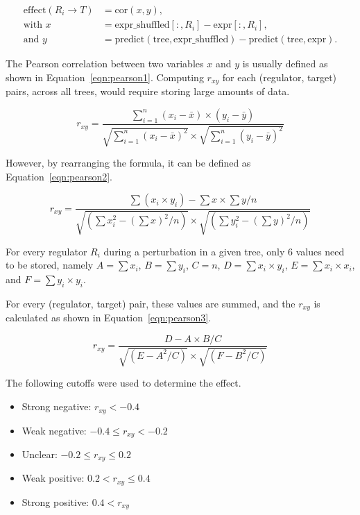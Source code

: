 \begin{align*}
  \text{effect}(R_i \rightarrow T) & = \text{cor}(x, y), \\
  \text{with } x & = \text{expr\_shuffled}[:,R_i] - \text{expr}[:,R_i], \\
  \text{and } y & = \text{predict}(\text{tree}, \text{expr\_shuffled}) - \text{predict}(\text{tree}, \text{expr}).
\end{align*}

The Pearson correlation between two variables $x$ and $y$ is usually defined as shown in Equation~\ref{eqn:pearson1}. Computing $r_{xy}$ for each (regulator, target) pairs, across all trees, would require storing large amounts of data.

\begin{equation}\label{eqn:pearson1}
	r_{xy} = \frac{\sum^n_{i=1} (x_i - \bar{x}) \times (y_i - \bar{y})}{\sqrt{\sum^n_{i=1}(x_i - \bar{x})^2}\times\sqrt{\sum^n_{i=1}(y_i - \bar{y})^2}}
\end{equation} 

However, by rearranging the formula, it can be defined as Equation~\ref{eqn:pearson2}.

\begin{equation}\label{eqn:pearson2}
r_{xy} = \frac{\sum(x_i \times y_i) - \sum x \times \sum y / n}{\sqrt{(\sum x_i^2 - (\sum x)^2 / n)} \times \sqrt{(\sum y_i^2 - (\sum y)^2 / n)}}
\end{equation}

For every regulator $R_i$ during a perturbation in a given tree, only 6 values need to be stored, namely $A = \sum x_i$, $B = \sum y_i$, $C = n$, $D = \sum{x_i \times y_i}$, $E = \sum{x_i \times x_i}$, and $F = \sum{y_i \times y_i}$.

For every (regulator, target) pair, these values are summed, and the $r_{xy}$ is calculated as shown in Equation~\ref{eqn:pearson3}.

\begin{equation}\label{eqn:pearson3}
r_{xy} = \frac{D - A \times B / C}{\sqrt{(E - A^2 / C)} \times \sqrt{(F - B^2 / C)}}
\end{equation}

The following cutoffs were used to determine the effect. 

\begin{itemize}
	\item Strong negative: $r_{xy} < -0.4$
  \item Weak negative: $-0.4 \leq r_{xy} < -0.2$
  \item Unclear: $-0.2 \leq r_{xy} \leq 0.2$
  \item Weak positive: $0.2 < r_{xy} \leq 0.4$
  \item Strong positive: $0.4 < r_{xy}$
\end{itemize} 

